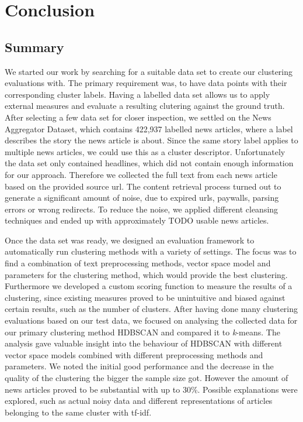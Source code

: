 \section{Conclusion}
\label{sec:6_conclusion}

\subsection{Summary}
\label{subsec:6_summary}

We started our work by searching for a suitable data set to create our clustering evaluations with.
The primary requirement was, to have data points with their corresponding cluster labels.
Having a labelled data set allows us to apply external measures and evaluate a resulting clutering against the ground truth.
After selecting a few data set for closer inspection, we settled on the News Aggregator Dataset,
which contains 422,937 labelled news articles, where a label describes the story the news article is about.
Since the same story label applies to multiple news articles, we could use this as a cluster descriptor.
Unfortunately the data set only contained headlines, which did not contain enough information for our approach.
Therefore we collected the full text from each news article based on the provided source url.
The content retrieval process turned out to generate a significant amount of noise,
due to expired urls, paywalls, parsing errors or wrong redirects.
To reduce the noise, we applied different cleansing techniques and ended up with approximately TODO usable news articles.

Once the data set was ready, we designed an evaluation framework to automatically run clustering methods with a variety of settings.
The focus was to find a combination of text preprocessing methods,
vector space model and parameters for the clustering method, which would provide the best clustering.
Furthermore we developed a custom scoring function to measure the results of a clustering,
since existing measures proved to be unintuitive and biased against certain results,
such as the number of clusters.
After having done many clustering evaluations based on our test data,
we focused on analysing the collected data for our primary clustering method HDBSCAN and compared it to \textit{k}-means.
The analysis gave valuable insight into the behaviour of HDBSCAN with different vector space models
combined with different preprocessing methods and parameters.
We noted the initial good performance and the decrease in the quality of the clustering the bigger the sample size got.
However the amount of news articles proved to be substantial with up to 30\%.
Possible explanations were explored,
such as actual noisy data and different representations of articles belonging to the same cluster with tf-idf.

